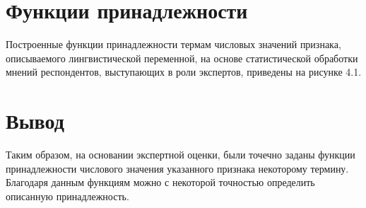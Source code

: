 \newpage

\section{Функции принадлежности}

Построенные функции принадлежности термам числовых значений признака, описываемого лингвистической переменной, на основе статистической обработки мнений респондентов, выступающих в роли экспертов, приведены на рисунке 4.1.


\section*{Вывод}

Таким образом, на основании экспертной оценки, были точечно заданы функции принадлежности числового значения указанного признака некоторому термину. Благодаря данным функциям можно с некоторой точностью определить описанную принадлежность.

